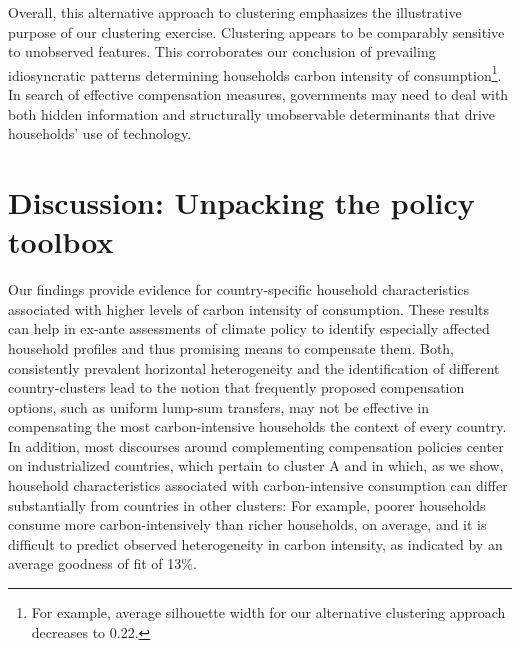 \documentclass[12pt, a4paper]{article}
\begin{document}
Overall, this alternative approach to clustering emphasizes the illustrative purpose of our clustering exercise. Clustering appears to be comparably sensitive to unobserved features. This corroborates our conclusion of prevailing idiosyncratic patterns determining households carbon intensity of consumption\footnote{For example, average silhouette width for our alternative clustering approach decreases to 0.22.}. In search of effective compensation measures, governments may need to deal with both hidden information and structurally unobservable determinants that drive households' use of technology.

\section{Discussion: Unpacking the policy toolbox} \label{sec:discussion}

Our findings provide evidence for country-specific household characteristics associated with higher levels of carbon intensity of consumption. These results can help in ex-ante assessments of climate policy to identify especially affected household profiles and thus promising means to compensate them. Both, consistently prevalent horizontal heterogeneity and the identification of different country-clusters lead to the notion that frequently proposed compensation options, such as uniform lump-sum transfers, may not be effective in compensating the most carbon-intensive households the context of every country. In addition, most discourses around complementing compensation policies center on industrialized countries, which pertain to cluster A and in which, as we show, household characteristics associated with carbon-intensive consumption can differ substantially from countries in other clusters: For example, poorer households consume more carbon-intensively than richer households, on average, and it is difficult to predict observed heterogeneity in carbon intensity, as indicated by an average goodness of fit of 13\%.
\end{document}
